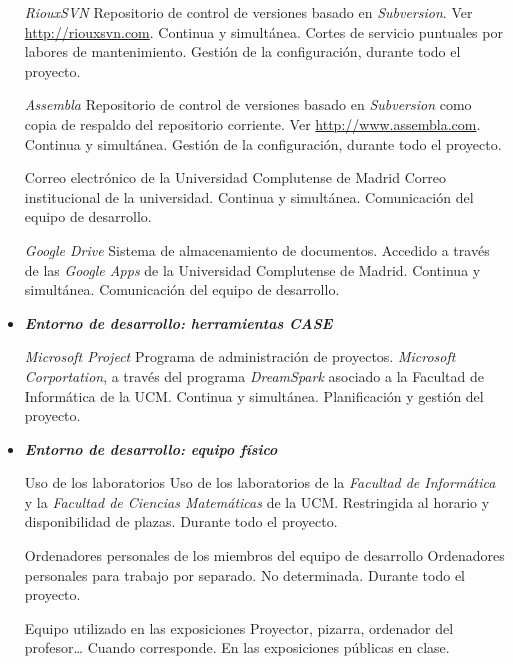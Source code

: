 \begin{itemize}
		{\textit{RiouxSVN}}
		{Repositorio de control de versiones basado en \textit{Subversion}.}
		{Ver \url{http://riouxsvn.com}.}
		{Continua y simultánea. Cortes de servicio puntuales por labores de mantenimiento.}
		{Gestión de la configuración, durante todo el proyecto.}

		{\textit{Assembla}}
		{Repositorio de control de versiones basado en \textit{Subversion} como copia de respaldo del
		repositorio corriente.}
		{Ver \url{http://www.assembla.com}.}
		{Continua y simultánea.}
		{Gestión de la configuración, durante todo el proyecto.}

		{Correo electrónico de la Universidad Complutense de Madrid}
		{Correo institucional de la universidad.}
		{}
		{Continua y simultánea.}
		{Comunicación del equipo de desarrollo.}

		{\textit{Google Drive}}
		{Sistema de almacenamiento de documentos. Accedido a través de las \textit{Google Apps} de la Universidad Complutense de Madrid.}
		{}
		{Continua y simultánea.}
		{Comunicación del equipo de desarrollo.}

	\bigskip
	\item {\itshape \bfseries Entorno de desarrollo: herramientas CASE} \\ \medskip

		{\textit{Microsoft Project}}
		{Programa de administración de proyectos.}
		{\textit{Microsoft Corportation}, a través del programa \textit{DreamSpark} asociado a la Facultad de Informática de la UCM.}
		{Continua y simultánea.}
		{Planificación y gestión del proyecto.}

	\bigskip
	\item {\itshape \bfseries Entorno de desarrollo: equipo físico} \\ \medskip

		{Uso de los laboratorios}
		{Uso de los laboratorios de la \textit{Facultad de Informática} y la \textit{Facultad de Ciencias Matemáticas} de la UCM.}
		{}
		{Restringida al horario y disponibilidad de plazas.}
		{Durante todo el proyecto.}

		{Ordenadores personales de los miembros del equipo de desarrollo}
		{Ordenadores personales para trabajo por separado.}
		{}
		{No determinada.}
		{Durante todo el proyecto.}

		{Equipo utilizado en las exposiciones}
		{Proyector, pizarra, ordenador del profesor\ldots}
		{}
		{Cuando corresponde.}
		{En las exposiciones públicas en clase.}


\end{itemize}
